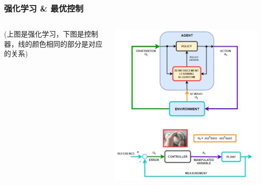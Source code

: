 \documentclass[12pt,AutoFakeBold,aspectratio=43,mathserif]{beamer}
\begin{document}
    \begin{frame}
        \frametitle{强化学习 \& 最优控制}
        \begin{columns}
            \begin{column}{.4\linewidth}
                (上图是强化学习，下图是控制器，线的颜色相同的部分是对应的关系)
            \end{column}
            \begin{column}{.5\linewidth}
                \includegraphics[width=.5\paperwidth]{figures/rl_for_control_systems.png}
            \end{column}
        \end{columns}
    \end{frame}
\end{document}
